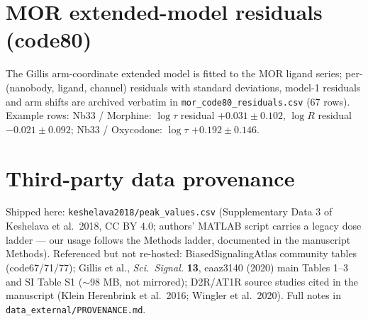 \documentclass[11pt]{article}
\begin{document}
\section{MOR extended-model residuals (code80)}

The Gillis arm-coordinate extended model is fitted to the MOR ligand
series; per-(nanobody, ligand, channel) residuals with standard
deviations, model-1 residuals and arm shifts are archived verbatim in
\texttt{mor\_code80\_residuals.csv} (67 rows). Example rows: Nb33 /
Morphine: $\log\tau$ residual $+0.031 \pm 0.102$, $\log R$ residual
$-0.021 \pm 0.092$; Nb33 / Oxycodone: $\log\tau$ $+0.192 \pm 0.146$.

\section{Third-party data provenance}

Shipped here: \texttt{keshelava2018/peak\_values.csv} (Supplementary
Data 3 of Keshelava et al.\ 2018, CC BY 4.0; authors' MATLAB script
carries a legacy dose ladder --- our usage follows the Methods ladder,
documented in the manuscript Methods). Referenced but not re-hosted:
BiasedSignalingAtlas community tables (code67/71/77); Gillis et al.,
\textit{Sci.\ Signal.} \textbf{13}, eaaz3140 (2020) main Tables 1--3 and
SI Table S1 ($\sim$98 MB, not mirrored);
D2R/AT1R source studies cited in the manuscript (Klein Herenbrink et
al.\ 2016; Wingler et al.\ 2020). Full notes in
\texttt{data\_external/PROVENANCE.md}.
\end{document}
